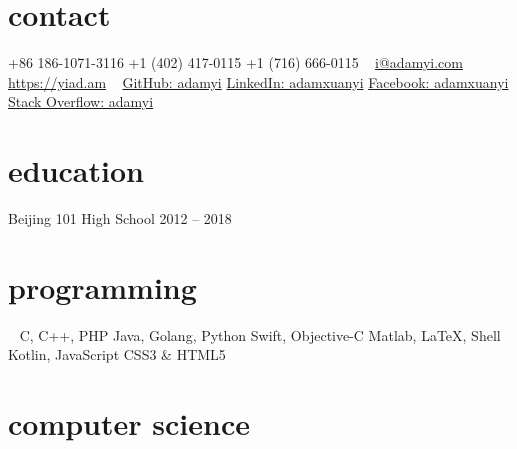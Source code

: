 \documentclass[hidelinks__VERSION__]{adamyi-cv} %
\begin{document}



\begin{aside} %
\section{contact}
+86 186-1071-3116
+1 (402) 417-0115
+1 (716) 666-0115
~
\href{mailto:i@adamyi.com}{i@adamyi.com}
\href{https://yiad.am}{https://yiad.am}
~
\href{https://github.com/adamyi}{GitHub: adamyi}
\href{https://github.com/adamyi}{LinkedIn: adamxuanyi}
\href{https://www.facebook.com/adamxuanyi}{Facebook: adamxuanyi}
\href{https://stackoverflow.com/users/6482303/adamyi}{Stack Overflow: adamyi}
\section{education}
Beijing 101 High School
2012 -- 2018
\section{programming}
~
C, C++, PHP
Java, Golang, Python
Swift, Objective-C
Matlab, \LaTeX, Shell
Kotlin, JavaScript
CSS3 \& HTML5
\versionsection
\end{aside}


\section{computer science}
\end{document}
